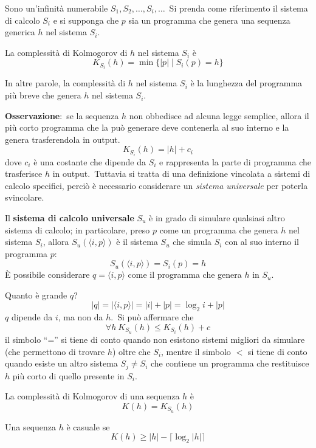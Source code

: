 Sono un'infinità numerabile $S_1, S_2, \dots, S_i, \dots$\
Si prenda come riferimento il sistema di calcolo $S_i$ e si supponga che $p$ sia un programma che genera una sequenza generica $h$ nel sistema $S_i$.\

\begin{definition}
    La complessità di Kolmogorov di $h$ nel sistema $S_i$ è
    \[K_{S_i}(h) = \min\{|p| \mid S_i(p) = h\}\]
\end{definition}

\noindent In altre parole, la complessità di $h$ nel sistema $S_i$ è la lunghezza del programma più breve che genera $h$ nel sistema $S_i$.\

\textbf{Osservazione}:\ se la sequenza $h$ non obbedisce ad alcuna legge semplice, allora il più corto programma che la può generare deve contenerla al suo interno e la genera trasferendola in output.\
\[K_{S_i}(h) = |h| + c_i\]
dove $c_i$ è una costante che dipende da $S_i$ e rappresenta la parte di programma che trasferisce $h$ in output.\
Tuttavia si tratta di una definizione vincolata a sistemi di calcolo specifici, perciò è necessario considerare un \textit{sistema universale} per poterla svincolare.\

Il \textbf{sistema di calcolo universale} $S_u$ è in grado di simulare qualsiasi altro sistema di calcolo; in particolare, preso $p$ come un programma che genera $h$ nel sistema $S_i$, allora $S_u(\langle i,p\rangle)$ è il sistema $S_u$ che simula $S_i$ con al suo interno il programma $p$:
\[S_u(\langle i,p\rangle) = S_i(p)= h\]
È possibile considerare $q =\langle i,p\rangle$ come il programma che genera $h$ in $S_u$.\

\noindent Quanto è grande $q$?
\[|q| = |\langle i,p\rangle| = |i| + |p| = \log_2i + |p|\]
$q$ dipende da $i$, ma non da $h$.\
Si può affermare che
\[\forall h\ K_{S_u}(h) \leq K_{S_i}(h) + c\]
il simbolo ``='' si tiene di conto quando non esistono sistemi migliori da simulare (che permettono di trovare $h$) oltre che $S_i$, mentre il simbolo $<$ si tiene di conto quando esiste un altro sistema $S_j \neq S_i$ che contiene un programma che restituisce $h$ più corto di
quello presente in $S_i$.\

\begin{definition}
    La complessità di Kolmogorov di una sequenza $h$ è
    \[K(h) = K_{S_u}(h)\]
\end{definition}

\begin{definition}
    Una sequenza $h$ è casuale se
    \[K(h) \geq |h| - \lceil \log_2|h|\rceil\]
\end{definition}

